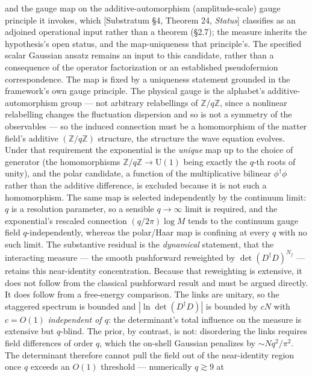 \documentclass[
]{article}
\begin{document}
and the gauge map on the additive-automorphism (amplitude-scale) gauge
principle it invokes, which {[}Substratum §4, Theorem 24,
\emph{Status}{]} classifies as an adjoined operational input rather than
a theorem (§2.7); the measure inherits the hypothesis's open status, and
the map-uniqueness that principle's. The specified scalar Gaussian
ansatz remains an input to this candidate, rather than a consequence of
the operator factorization or an established pseudofermion
correspondence. The map is fixed by a uniqueness statement grounded in
the framework's own gauge principle. The physical gauge is the
alphabet's additive-automorphism group --- not arbitrary relabellings of
\(\mathbb{Z}/q\mathbb{Z}\), since a nonlinear relabelling changes the
fluctuation dispersion and so is not a symmetry of the observables ---
so the induced connection must be a homomorphism of the matter field's
additive \((\mathbb{Z}/q\mathbb{Z})\) structure, the structure the wave
equation evolves. Under that requirement the exponential is the
\emph{unique} map up to the choice of generator (the homomorphisms
\(\mathbb{Z}/q\mathbb{Z} \to \mathrm{U}(1)\) being exactly the \(q\)-th
roots of unity), and the polar candidate, a function of the
multiplicative bilinear \(\phi^\dagger\phi\) rather than the additive
difference, is excluded because it is not such a homomorphism. The same
map is selected independently by the continuum limit: \(q\) is a
resolution parameter, so a sensible \(q \to \infty\) limit is required,
and the exponential's rescaled connection \((q/2\pi)\log M\) tends to
the continuum gauge field \(q\)-independently, whereas the polar/Haar
map is confining at every \(q\) with no such limit. The substantive
residual is the \emph{dynamical} statement, that the interacting measure
--- the smooth pushforward reweighted by \(\det(D^\dagger D)^{N_f}\) ---
retains this near-identity concentration. Because that reweighting is
extensive, it does not follow from the classical pushforward result and
must be argued directly. It does follow from a free-energy comparison.
The links are unitary, so the staggered spectrum is bounded and
\(|\ln\det(D^\dagger D)|\) is bounded by \(cN\) with \(c = O(1)\)
\emph{independent of \(q\)}: the determinant's total influence on the
measure is extensive but \(q\)-blind. The prior, by contrast, is not:
disordering the links requires field differences of order \(q\), which
the on-shell Gaussian penalizes by \(\sim Nq^2/\pi^2\). The determinant
therefore cannot pull the field out of the near-identity region once
\(q\) exceeds an \(O(1)\) threshold --- numerically \(q \gtrsim 9\) at
\end{document}
